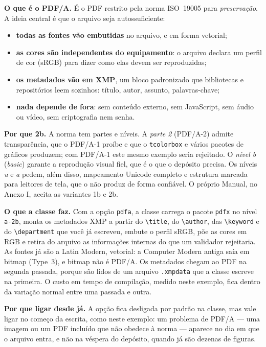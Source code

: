 \documentclass[dsc,setavermelha]{ufrj}
\theoremstyle{plain}
\theoremstyle{definition}
\theoremstyle{remark}
\begin{document}
\textbf{O que é o PDF/A.} É o PDF restrito pela norma ISO~19005 para \emph{preservação}. A ideia central é que o arquivo seja autossuficiente:
\begin{itemize}
  \item \textbf{todas as fontes vão embutidas} no arquivo, e em forma vetorial;
  \item \textbf{as cores são independentes do equipamento}: o arquivo declara um perfil de cor (sRGB) para dizer como elas devem ser reproduzidas;
  \item \textbf{os metadados vão em XMP}, um bloco padronizado que bibliotecas e repositórios leem sozinhos: título, autor, assunto, palavras-chave;
  \item \textbf{nada depende de fora}: sem conteúdo externo, sem JavaScript, sem áudio ou vídeo, sem criptografia nem senha.
\end{itemize}

\textbf{Por que 2b.} A norma tem partes e níveis. A \emph{parte 2} (PDF/A-2) admite transparência, que o PDF/A-1 proíbe e que o \verb|tcolorbox| e vários pacotes de gráficos produzem; com PDF/A-1 este mesmo exemplo seria rejeitado. O \emph{nível b} (\emph{basic}) garante a reprodução visual fiel, que é o que o depósito precisa. Os níveis \emph{u} e \emph{a} pedem, além disso, mapeamento Unicode completo e estrutura marcada para leitores de tela, que o  não produz de forma confiável. O próprio Manual, no Anexo I, aceita as variantes 1b e 2b.

\textbf{O que a classe faz.} Com a opção \verb|pdfa|, a classe carrega o pacote \verb|pdfx| no nível \verb|a-2b|, monta os metadados XMP a partir do \verb|\title|, do \verb|\author|, das \verb|\keyword| e do \verb|\department| que você já escreveu, embute o perfil sRGB, põe as cores em RGB e retira do arquivo as informações internas do  que um validador rejeitaria. As fontes já são a Latin Modern, vetorial: a Computer Modern antiga saía em bitmap (Type~3), e bitmap não é PDF/A. Os metadados chegam ao PDF na segunda passada, porque são lidos de um arquivo \verb|.xmpdata| que a classe escreve na primeira. O custo em tempo de compilação, medido neste exemplo, fica dentro da variação normal entre uma passada e outra.

\textbf{Por que ligar desde já.} A opção fica desligada por padrão na classe, mas vale ligar no começo da escrita, como neste exemplo: um problema de PDF/A --- uma imagem ou um PDF incluído que não obedece à norma --- aparece no dia em que o arquivo entra, e não na véspera do depósito, quando já são dezenas de figuras.
\end{document}
